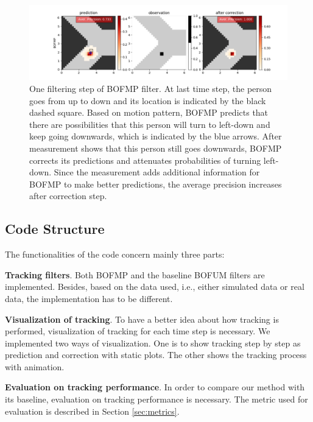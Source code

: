 \begin{figure}[ht]
  \centering
    \includegraphics[width=\textwidth]{figures/correction_step_1.png}
    \caption[One filtering step of BOFMP filter.]{One filtering step of BOFMP filter. At last time step, the person goes from up to down and its location is indicated by the black dashed square. Based on motion pattern, BOFMP predicts that there are possibilities that this person will turn to left-down and keep going downwards, which is indicated by the blue arrows. After measurement shows that this person still goes downwards, BOFMP corrects its predictions and attenuates probabilities of turning left-down. Since the measurement adds additional information for BOFMP to make better predictions, the average precision increases after correction step.}
    \label{fig:correction}
\end{figure}

\subsection{Code Structure}

The functionalities of the code concern mainly three parts:
\begin{my_enumerate}
\item \textbf{Tracking filters}. Both BOFMP and the baseline BOFUM filters are implemented. Besides, based on the data used, i.e., either simulated data or real data, the implementation has to be different. 
\item \textbf{Visualization of tracking}. To have a better idea about how tracking is performed, visualization of tracking for each time step is necessary. We implemented two ways of visualization. One is to show tracking step by step as prediction and correction with static plots. The other shows the tracking process with animation. 
\item \textbf{Evaluation on tracking performance}. In order to compare our method with its baseline, evaluation on tracking performance is necessary. The metric used for evaluation is described in Section \ref{sec:metrics}.
\end{my_enumerate}

